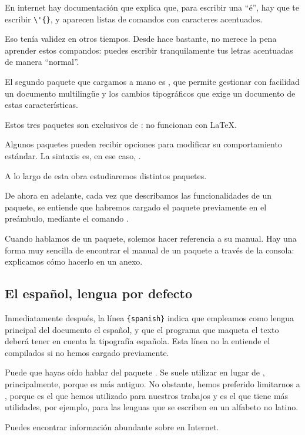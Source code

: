 \begin{plusloins}
En internet hay documentación que explica que, para escribir una \enquote{é}, hay que te escribir \verb|\'{}|, y aparecen listas de comandos con caracteres acentuados.

Eso tenía validez en otros tiempos. Desde hace bastante, no merece la pena aprender estos compandos: puedes escribir tranquilamente tus letras acentuadas de manera \enquote{normal}. 
\end{plusloins}

El segundo paquete que cargamos a mano es , que permite gestionar con facilidad un documento multilingüe y los cambios tipográficos que exige un documento de estas características.

Estos tres paquetes son exclusivos de \XeLaTeX{}: no funcionan con \LaTeX.

Algunos paquetes pueden recibir opciones para modificar su comportamiento estándar. La sintaxis es, en ese caso, .

A lo largo de esta obra estudiaremos distintos paquetes.

\begin{attention}
De ahora en adelante, cada vez que describamos las funcionalidades de un paquete, se entiende que habremos cargado el paquete previamente en el preámbulo, mediante el comando .
\end{attention}

\begin{plusloins}
Cuando hablamos de un paquete, solemos hacer referencia a su manual. Hay una forma muy sencilla de encontrar el manual de un paquete a través de la consola: explicamos cómo hacerlo en un anexo.
\end{plusloins}

\subsection{El español, lengua por defecto\label{french}}

Inmediatamente después, la línea \verb|{spanish}| indica que empleamos como lengua principal del documento el español, y que el programa que maqueta el texto deberá tener en cuenta la tipografía española. Esta línea no la entiende el compilados si no hemos cargado previamente.

\begin{plusloins}
Puede que hayas oído hablar del paquete . Se suele utilizar en lugar de , principalmente, porque es más antiguo. No obstante, hemos preferido limitarnos a , porque es el que hemos utilizado para nuestros trabajos y es el que tiene más utilidades, por ejemplo, para las lenguas que se escriben en un alfabeto no latino.

Puedes encontrar información abundante sobre  en Internet.

\end{plusloins}

